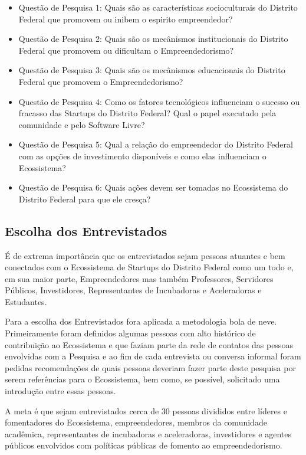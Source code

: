 \begin{itemize}
  \item Questão de Pesquisa 1: Quais são as características socioculturais do Distrito Federal que promovem ou inibem o espirito empreendedor?
  \item Questão de Pesquisa 2: Quais são os mecânismos institucionais do Distrito Federal que promovem ou dificultam o Empreendedorismo?
  \item Questão de Pesquisa 3: Quais são os mecânismos educacionais do Distrito Federal que promovem o Empreendedorismo?
  \item Questão de Pesquisa 4: Como os fatores tecnológicos influenciam o sucesso ou fracasso das Startups do Distrito Federal? Qual o papel executado pela comunidade e pelo Software Livre?
  \item Questão de Pesquisa 5: Qual a relação do empreendedor do Distrito Federal com as opções de investimento disponíveis e como elas influenciam o Ecossistema?
  \item Questão de Pesquisa 6: Quais ações devem ser tomadas no Ecossistema do Distrito Federal para que ele cresça? 

\end{itemize}

\subsection{Escolha dos Entrevistados}
\label{subsection:escolha_dos_entrevistados}

É de extrema importância que os entrevistados sejam pessoas atuantes e bem conectados com o Ecossistema de Startups do Distrito Federal como um todo e, em sua maior parte, Empreendedores mas também Professores, Servidores Públicos, Investidores, Representantes de Incubadoras e Aceleradoras e Estudantes. 

Para a escolha dos Entrevistados fora aplicada a metodologia bola de neve. Primeiramente foram definidos algumas pessoas com alto histórico de contribuição ao Ecossistema e que faziam parte da rede de contatos das pessoas envolvidas com a Pesquisa e ao fim de cada entrevista ou conversa informal foram pedidas recomendações de quais pessoas deveriam fazer parte deste pesquisa por serem referências para o Ecossistema, bem como, se possível, solicitado uma introdução entre essas pessoas. 

A meta é que sejam entrevistados cerca de 30 pessoas divididos entre líderes e fomentadores do Ecossistema, empreendedores, membros da comunidade acadêmica, representantes de incubadoras e aceleradoras, investidores e agentes públicos envolvidos com políticas públicas de fomento ao empreendedorismo. 

